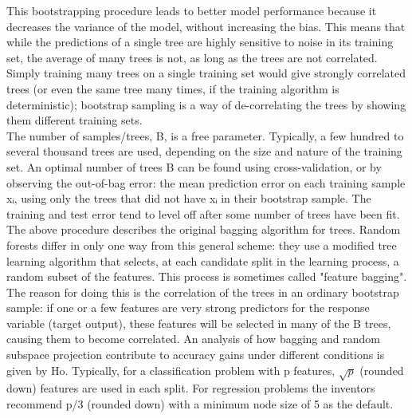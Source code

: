 \documentclass[12pt]{article}
\begin{document}
\begin{justify}
		This bootstrapping procedure leads to better model performance because it decreases the variance of the model, without increasing the bias. This means that while the predictions of a single tree are highly sensitive to noise in its training set, the average of many trees is not, as long as the trees are not correlated. Simply training many trees on a single training set would give strongly correlated trees (or even the same tree many times, if the training algorithm is deterministic); bootstrap sampling is a way of de-correlating the trees by showing them different training sets. \\The number of samples/trees, B, is a free parameter. Typically, a few hundred to several thousand trees are used, depending on the size and nature of the training set. An optimal number of trees B can be found using cross-validation, or by observing the out-of-bag error: the mean prediction error on each training sample xᵢ, using only the trees that did not have xᵢ in their bootstrap sample. The training and test error tend to level off after some number of trees have been fit.\\The above procedure describes the original bagging algorithm for trees. Random forests differ in only one way from this general scheme: they use a modified tree learning algorithm that selects, at each candidate split in the learning process, a random subset of the features. This process is sometimes called "feature bagging". The reason for doing this is the correlation of the trees in an ordinary bootstrap sample: if one or a few features are very strong predictors for the response variable (target output), these features will be selected in many of the B trees, causing them to become correlated. An analysis of how bagging and random subspace projection contribute to accuracy gains under different conditions is given by Ho. Typically, for a classification problem with p features, $ \sqrt{p} $ (rounded down) features are used in each split. For regression problems the inventors recommend p/3 (rounded down) with a minimum node size of 5 as the default.
		\end{justify}
\end{document}
